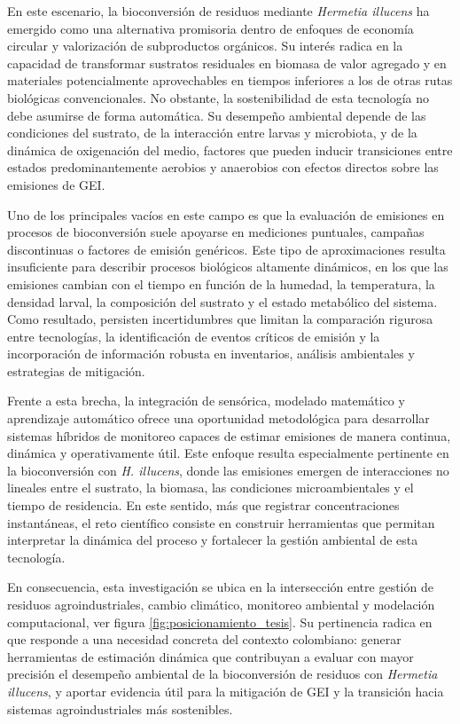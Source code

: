 En este escenario, la bioconversión de residuos mediante \textit{Hermetia
illucens} ha emergido como una alternativa promisoria dentro de enfoques de
economía circular y valorización de subproductos orgánicos. Su interés radica en
la capacidad de transformar sustratos residuales en biomasa de valor agregado y
en materiales potencialmente aprovechables en tiempos inferiores a los de otras
rutas biológicas convencionales. No obstante, la sostenibilidad de esta
tecnología no debe asumirse de forma automática. Su desempeño ambiental depende
de las condiciones del sustrato, de la interacción entre larvas y microbiota, y
de la dinámica de oxigenación del medio, factores que pueden inducir transiciones
entre estados predominantemente aerobios y anaerobios con efectos directos sobre
las emisiones de GEI.

Uno de los principales vacíos en este campo es que la evaluación de emisiones en
procesos de bioconversión suele apoyarse en mediciones puntuales, campañas
discontinuas o factores de emisión genéricos. Este tipo de aproximaciones resulta
insuficiente para describir procesos biológicos altamente dinámicos, en los que
las emisiones cambian con el tiempo en función de la humedad, la temperatura, la
densidad larval, la composición del sustrato y el estado metabólico del sistema.
Como resultado, persisten incertidumbres que limitan la comparación rigurosa
entre tecnologías, la identificación de eventos críticos de emisión y la
incorporación de información robusta en inventarios, análisis ambientales y
estrategias de mitigación.

Frente a esta brecha, la integración de sensórica, modelado matemático y
aprendizaje automático ofrece una oportunidad metodológica para desarrollar
sistemas híbridos de monitoreo capaces de estimar emisiones de manera continua,
dinámica y operativamente útil. Este enfoque resulta especialmente pertinente en
la bioconversión con \textit{H. illucens}, donde las emisiones emergen de
interacciones no lineales entre el sustrato, la biomasa, las condiciones
microambientales y el tiempo de residencia. En este sentido, más que registrar
concentraciones instantáneas, el reto científico consiste en construir
herramientas que permitan interpretar la dinámica del proceso y fortalecer la
gestión ambiental de esta tecnología.

En consecuencia, esta investigación se ubica en la intersección entre gestión de
residuos agroindustriales, cambio climático, monitoreo ambiental y modelación
computacional, ver figura \ref{fig:posicionamiento_tesis}. Su pertinencia radica en que responde a una necesidad concreta del
contexto colombiano: generar herramientas de estimación dinámica que contribuyan
a evaluar con mayor precisión el desempeño ambiental de la bioconversión de
residuos con \textit{Hermetia illucens}, y aportar evidencia útil para la
mitigación de GEI y la transición hacia sistemas agroindustriales más
sostenibles.

